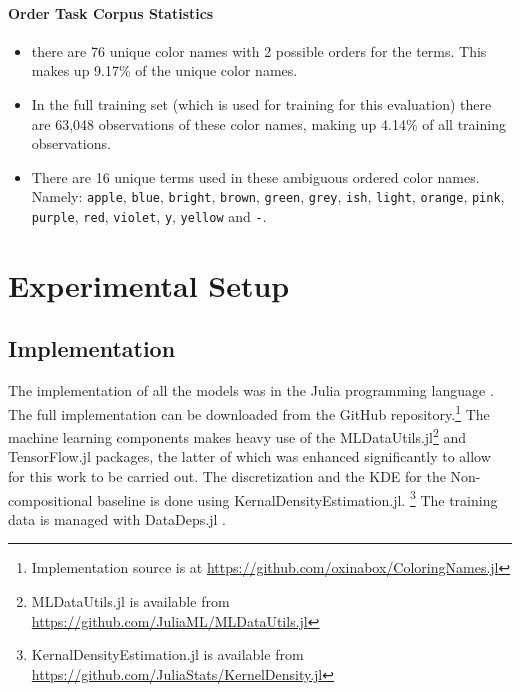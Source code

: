 \documentclass[]{clv3}
\newcommand{\parencite}{\citep}
\newcommand{\natlang}[1]{\texttt{#1}}
\newcommand{\empmodel}{Non-compositional baseline} %
\begin{document}
\paragraph{Order Task Corpus Statistics}
\begin{itemize}
	\item there are 76 unique color names with 2 possible orders for the terms. This makes up 9.17\% of the unique color names.
	\item In the full training set (which is used for training for this evaluation) there are 63,048 observations of these color names, making up 4.14\% of all training observations.
	\item There are 16 unique terms used in these ambiguous ordered color names. Namely:
	\natlang{apple}, \natlang{blue}, \natlang{bright}, \natlang{brown}, \natlang{green}, \natlang{grey}, \natlang{ish}, \natlang{light}, \natlang{orange}, \natlang{pink}, \natlang{purple}, \natlang{red}, \natlang{violet}, \natlang{y}, \natlang{yellow} and \natlang{-}.
\end{itemize}



\section{Experimental Setup}

\subsection{Implementation}
The implementation of all the models was in the Julia programming language \parencite{Julia}.
The full implementation can be downloaded from the GitHub repository.\footnote{Implementation source is at \url{https://github.com/oxinabox/ColoringNames.jl}}
The machine learning components makes heavy use of the MLDataUtils.jl\footnote{MLDataUtils.jl is available from \url{https://github.com/JuliaML/MLDataUtils.jl}} and TensorFlow.jl \parencite{TensorFlowJulia}
 packages,
the latter of which was enhanced significantly to allow for this work to be carried out.
The discretization and the KDE for the \empmodel{} is done using KernalDensityEstimation.jl.%
\footnote{KernalDensityEstimation.jl  is available from \url{https://github.com/JuliaStats/KernelDensity.jl}}
The training data is managed with DataDeps.jl \parencite{2018arXiv180801091W}.
\end{document}
